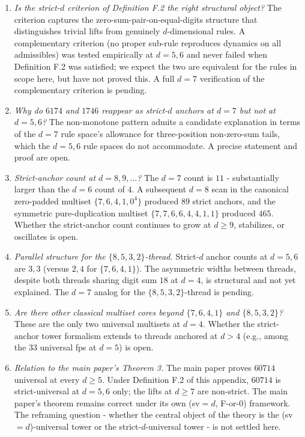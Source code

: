 \documentclass[11pt,letterpaper]{article}
\theoremstyle{paperstyle}
\theoremstyle{paperstyledef}
\theoremstyle{paperstylerem}
\begin{document}
\begin{enumerate}
\def\labelenumi{\arabic{enumi}.}
\item
  \emph{Is the strict-\(d\) criterion of Definition F.2 the right
  structural object?} The criterion captures the
  zero-sum-pair-on-equal-digits structure that distinguishes trivial
  lifts from genuinely \(d\)-dimensional rules. A complementary
  criterion (no proper sub-rule reproduces dynamics on all admissibles)
  was tested empirically at \(d = 5, 6\) and never failed when
  Definition F.2 was satisfied; we expect the two are equivalent for the
  rules in scope here, but have not proved this. A full \(d = 7\)
  verification of the complementary criterion is pending.
\item
  \emph{Why do \(6174\) and \(1746\) reappear as strict-\(d\) anchors at
  \(d = 7\) but not at \(d = 5, 6\)?} The non-monotone pattern admits a
  candidate explanation in terms of the \(d = 7\) rule space's allowance
  for three-position non-zero-sum tails, which the \(d = 5, 6\) rule
  spaces do not accommodate. A precise statement and proof are open.
\item
  \emph{Strict-anchor count at \(d = 8, 9, \ldots\)?} The \(d = 7\)
  count is \(11\) - substantially larger than the \(d = 6\) count of
  \(4\). A subsequent \(d = 8\) scan in the canonical zero-padded
  multiset \(\{7, 6, 4, 1, 0^4\}\) produced \(89\) strict anchors, and
  the symmetric pure-duplication multiset \(\{7, 7, 6, 6, 4, 4, 1, 1\}\)
  produced \(465\). Whether the strict-anchor count continues to grow at
  \(d \geq 9\), stabilizes, or oscillates is open.
\item
  \emph{Parallel structure for the \(\{8, 5, 3, 2\}\)-thread.}
  Strict-\(d\) anchor counts at \(d = 5, 6\) are \(3, 3\) (versus
  \(2, 4\) for \(\{7, 6, 4, 1\}\)). The asymmetric widths between
  threads, despite both threads sharing digit sum \(18\) at \(d = 4\),
  is structural and not yet explained. The \(d = 7\) analog for the
  \(\{8, 5, 3, 2\}\)-thread is pending.
\item
  \emph{Are there other classical multiset cores beyond \(\{7,6,4,1\}\)
  and \(\{8,5,3,2\}\)?} These are the only two universal multisets at
  \(d = 4\). Whether the strict-anchor tower formalism extends to
  threads anchored at \(d > 4\) (e.g., among the \(33\) universal fps at
  \(d = 5\)) is open.
\item
  \emph{Relation to the main paper's Theorem 3.} The main paper proves
  \(60714\) universal at every \(d \geq 5\). Under Definition F.2 of
  this appendix, \(60714\) is strict-universal at \(d = 5, 6\) only; the
  lifts at \(d \geq 7\) are non-strict. The main paper's theorem remains
  correct under its own (sv\(=d\), F-or-0) framework. The reframing
  question - whether the central object of the theory is the
  (sv\(=d\))-universal tower or the strict-\(d\)-universal tower - is
  not settled here.
\end{enumerate}
\end{document}

